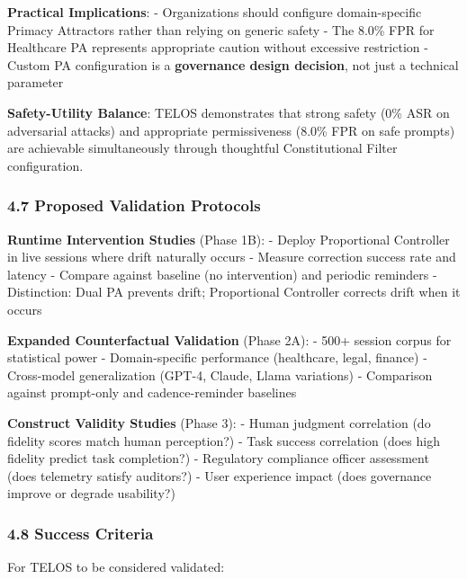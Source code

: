 \textbf{Practical Implications}: - Organizations should configure
domain-specific Primacy Attractors rather than relying on generic safety
- The 8.0\% FPR for Healthcare PA represents appropriate caution without
excessive restriction - Custom PA configuration is a \textbf{governance
design decision}, not just a technical parameter

\textbf{Safety-Utility Balance}: TELOS demonstrates that strong safety
(0\% ASR on adversarial attacks) and appropriate permissiveness (8.0\%
FPR on safe prompts) are achievable simultaneously through thoughtful
Constitutional Filter configuration.

\subsubsection{4.7 Proposed Validation
Protocols}\label{proposed-validation-protocols}

\textbf{Runtime Intervention Studies} (Phase 1B): - Deploy Proportional
Controller in live sessions where drift naturally occurs - Measure
correction success rate and latency - Compare against baseline (no
intervention) and periodic reminders - Distinction: Dual PA prevents
drift; Proportional Controller corrects drift when it occurs

\textbf{Expanded Counterfactual Validation} (Phase 2A): - 500+ session
corpus for statistical power - Domain-specific performance (healthcare,
legal, finance) - Cross-model generalization (GPT-4, Claude, Llama
variations) - Comparison against prompt-only and cadence-reminder
baselines

\textbf{Construct Validity Studies} (Phase 3): - Human judgment
correlation (do fidelity scores match human perception?) - Task success
correlation (does high fidelity predict task completion?) - Regulatory
compliance officer assessment (does telemetry satisfy auditors?) - User
experience impact (does governance improve or degrade usability?)

\subsubsection{4.8 Success Criteria}\label{success-criteria}

For TELOS to be considered validated:

